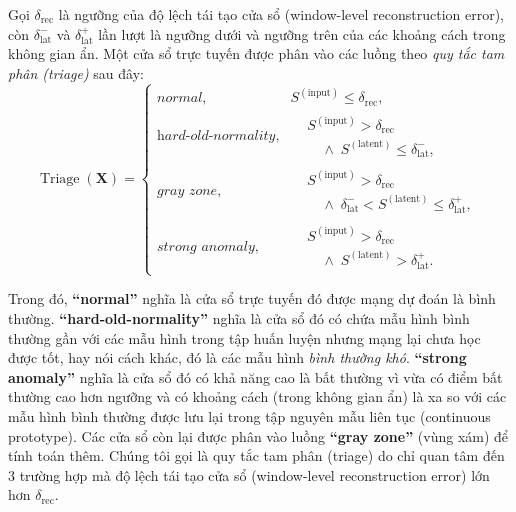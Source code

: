 Gọi \(\delta_{\mathrm{rec}}\) là ngưỡng của độ lệch tái tạo cửa sổ (window-level reconstruction error), còn
\(\delta_{\mathrm{lat}}^{-}\) và
\(\delta_{\mathrm{lat}}^{+}\) lần lượt là ngưỡng dưới và ngưỡng trên của các khoảng cách trong không gian ẩn. Một cửa sổ trực tuyến được phân vào các luồng theo \textit{quy tắc tam phân (triage)} sau đây:
\begin{equation}
\operatorname{Triage}(\mathbf{X})
=
\begin{cases}
\textit{normal},
&
S^{(\mathrm{input})}
\leq \delta_{\mathrm{rec}},
\\[12pt]

\textit{hard-old-normality},
&
\begin{aligned}
&S^{(\mathrm{input})}
> \delta_{\mathrm{rec}}
\\[3pt]
&\quad {}\land{}\;
S^{(\mathrm{latent})}
\leq \delta_{\mathrm{lat}}^{-},
\end{aligned}
\\[12pt]

\textit{gray zone},
&
\begin{aligned}
&S^{(\mathrm{input})}
> \delta_{\mathrm{rec}}
\\[3pt]
&\quad {}\land{}\;
\delta_{\mathrm{lat}}^{-}
<
S^{(\mathrm{latent})}
\leq
\delta_{\mathrm{lat}}^{+},
\end{aligned}
\\[12pt]

\textit{strong anomaly},
&
\begin{aligned}
&S^{(\mathrm{input})}
> \delta_{\mathrm{rec}}
\\[3pt]
&\quad {}\land{}\;
S^{(\mathrm{latent})}
>
\delta_{\mathrm{lat}}^{+}.
\end{aligned}
\end{cases}
\end{equation}

Trong đó, \textbf{``normal''} nghĩa là cửa sổ trực tuyến đó được mạng dự đoán là bình thường. \textbf{``hard-old-normality''} nghĩa là cửa sổ đó có chứa mẫu hình bình thường gần với các mẫu hình trong tập huấn luyện nhưng mạng lại chưa học được tốt, hay nói cách khác, đó là các mẫu hình \textit{bình thường khó}. \textbf{``strong anomaly''} nghĩa là cửa sổ đó có khả năng cao là bất thường vì vừa có điểm bất thường cao hơn ngưỡng và có khoảng cách (trong không gian ẩn) là xa so với các mẫu hình bình thường được lưu lại trong tập nguyên mẫu liên tục (continuous prototype). Các cửa sổ còn lại được phân vào luồng \textbf{``gray zone''} (vùng xám) để tính toán thêm. Chúng tôi gọi là quy tắc tam phân (triage) do chỉ quan tâm đến 3 trường hợp mà độ lệch tái tạo cửa sổ (window-level reconstruction error) lớn hơn \(\delta_{\mathrm{rec}}\).

